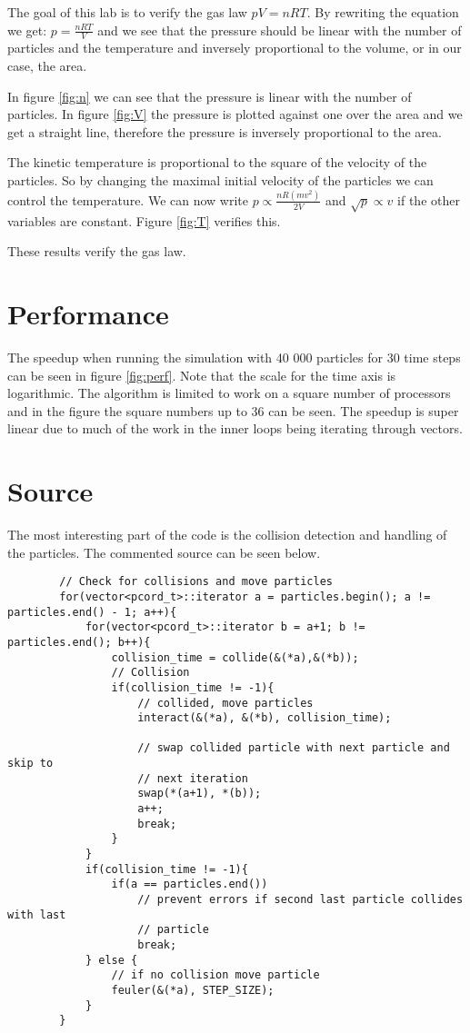 \documentclass[a4paper, 12pt]{article}
\begin{document}
The goal of this lab is to verify the gas law $pV = nRT$.
By rewriting the equation we get: $p = \frac{nRT}{V}$ and we see that the
pressure should be linear with the number of particles and the temperature and
inversely proportional to the volume, or in our case, the area.

In figure \ref{fig:n} we can see that the pressure is linear with the number of
particles. In figure \ref{fig:V} the pressure is plotted against one over the
area and we get a straight line, therefore the pressure is inversely
proportional to the area.

The kinetic temperature is proportional to the square of the velocity of the
particles. So by changing the maximal initial velocity of the particles we can
control the temperature. We can now write $p \propto \frac{nR(mv^2)}{2V}$ and
$\sqrt{p} \propto v$ if the other variables are constant. Figure \ref{fig:T}
verifies this.

These results verify the gas law.

\section{Performance}
The speedup when running the simulation with 40 000 particles for 30 time
steps can be seen in figure \ref{fig:perf}. Note that the scale for the time
axis is logarithmic. The algorithm is limited to work on a square
number of processors and in the figure the square numbers up to 36 can be seen.
The speedup is super linear due to much of the work in the inner loops being 
iterating through vectors.

\section{Source}
\label{sec:src}
The most interesting part of the code is the collision detection and handling of
the particles. The commented source can be seen below.
\begin{lstlisting}
        // Check for collisions and move particles
        for(vector<pcord_t>::iterator a = particles.begin(); a != particles.end() - 1; a++){
            for(vector<pcord_t>::iterator b = a+1; b != particles.end(); b++){
                collision_time = collide(&(*a),&(*b));
                // Collision
                if(collision_time != -1){
                    // collided, move particles
                    interact(&(*a), &(*b), collision_time);

                    // swap collided particle with next particle and skip to
                    // next iteration
                    swap(*(a+1), *(b));
                    a++;
                    break;
                }
            }
            if(collision_time != -1){
                if(a == particles.end())
                    // prevent errors if second last particle collides with last
                    // particle
                    break;
            } else {
                // if no collision move particle
                feuler(&(*a), STEP_SIZE);
            }
        }
\end{lstlisting}
\end{document}
